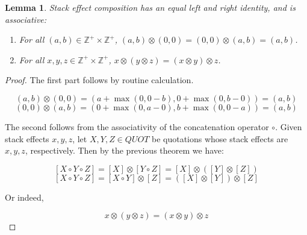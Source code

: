 \documentclass{amsart}
\theoremstyle{plain}
\newtheorem{lemma}[theorem]{Lemma}
\theoremstyle{definition}
\begin{document}
\begin{lemma}
Stack effect composition has an equal left and right identity, and is associative:

\begin{enumerate}
\item For all $(a,b) \in \mathbb{Z}^+\times\mathbb{Z}^+$, $(a,b) \otimes (0,0) = (0,0) \otimes (a,b) = (a,b)$.
\item For all $x,y,z \in \mathbb{Z}^+\times\mathbb{Z}^+$, $x\otimes (y\otimes z) = (x\otimes y) \otimes z$.
\end{enumerate}

\end{lemma}

\begin{proof}
The first part follows by routine calculation.

$$(a,b) \otimes (0,0) = (a+\max(0,0-b),0+\max(0,b-0)) = (a,b)$$
$$(0,0) \otimes (a,b) = (0+\max(0,a-0),b+\max(0,0-a)) = (a,b)$$

The second follows from the associativity of the concatenation operator $\circ$. Given stack effects $x,y,z$, let $X,Y,Z \in QUOT$ be quotations whose stack effects are $x,y,z$, respectively. Then by the previous theorem we have:

$$[X\circ Y\circ Z] = [X] \otimes [Y\circ Z] = [X] \otimes ([Y] \otimes [Z])$$
$$[X\circ Y\circ Z] = [X\circ Y] \otimes [Z] = ([X] \otimes [Y]) \otimes [Z]$$

Or indeed,

$$x\otimes(y\otimes z) = (x\otimes y)\otimes z$$

\end{proof}
\end{document}
